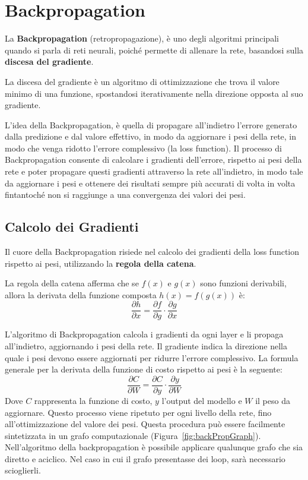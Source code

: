 \section{Backpropagation}
La \textbf{Backpropagation} (retropropagazione), è uno degli algoritmi principali quando si parla di reti neurali, poiché permette di allenare la rete, basandosi sulla \textbf{discesa del gradiente}.
\begin{Definizione}
    La discesa del gradiente è un algoritmo di ottimizzazione che trova il valore minimo di una funzione, spostandosi iterativamente nella direzione opposta al suo gradiente. 
\end{Definizione}
L'idea della Backpropagation, è quella di propagare all'indietro l'errore generato dalla predizione e dal valore effettivo, in modo da aggiornare i pesi della rete, in modo che venga ridotto l'errore complessivo (la loss function). Il processo di Backpropagation consente di calcolare i gradienti dell'errore, rispetto ai pesi della rete e poter propagare questi gradienti attraverso la rete all'indietro, in modo tale da aggiornare i pesi e ottenere dei risultati sempre più accurati di volta in volta fintantoché non si raggiunge a una convergenza dei valori dei pesi.

\subsection{Calcolo dei Gradienti}
Il cuore della Backpropagation risiede nel calcolo dei gradienti della loss function rispetto ai pesi, utilizzando la \textbf{regola della catena}.
\begin{Definizione}
    La regola della catena afferma che se $f(x)$ e $g(x)$ sono funzioni derivabili, allora la derivata della funzione composta $h(x) = f(g(x))$ è:
    \[
    \frac{\partial h}{\partial x} = \frac{\partial f}{\partial g} \cdot \frac{\partial g}{\partial x}
    \]
\end{Definizione}
L'algoritmo di Backpropagation calcola i gradienti da ogni layer e li propaga all'indietro, aggiornando i pesi della rete. Il gradiente indica la direzione nella quale i pesi devono essere aggiornati per ridurre l'errore complessivo. La formula generale per la derivata della funzione di costo rispetto ai pesi è la seguente:
\begin{equation}
    \frac{\partial C}{\partial W} = \frac{\partial C}{\partial y} \cdot \frac{\partial y}{\partial W}
\end{equation}
Dove $C$ rappresenta la funzione di costo, $y$ l'output del modello e $W$ il peso da aggiornare. Questo processo viene ripetuto per ogni livello della rete, fino all'ottimizzazione del valore dei pesi. Questa procedura può essere facilmente sintetizzata in un grafo computazionale (Figura~\ref{fig:backPropGraph}). Nell'algoritmo della backpropagation è possibile applicare qualunque grafo che sia diretto e aciclico. Nel caso in cui il grafo presentasse dei loop, sarà necessario scioglierli.

